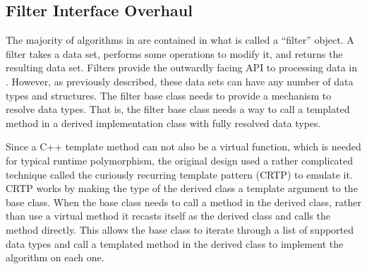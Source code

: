 \subsection{Filter Interface Overhaul}
\label{sec:filter-overhaul}


The majority of algorithms in \vtkm are contained in what is called a ``filter'' object.
A filter takes a data set, performs some operations to modify it, and returns the resulting data set.
Filters provide the outwardly facing API to processing data in \vtkm.
However, as previously described, these data sets can have any number of data types and structures.
The \vtkm filter base class needs to provide a mechanism to resolve data types.
That is, the filter base class needs a way to call a templated method in a derived implementation class with fully resolved data types.

Since a C++ template method can not also be a virtual function, which is needed for typical runtime polymorphism, the original design used a rather complicated technique called the curiously recurring template pattern (CRTP) \cite{Coplien1995} to emulate it.
CRTP works by making the type of the derived class a template argument to the base class.
When the base class needs to call a method in the derived class, rather than use a virtual method it recasts itself as the derived class and calls the method directly.
This allows the base class to iterate through a list of supported data types and call a templated method in the derived class to implement the algorithm on each one.


